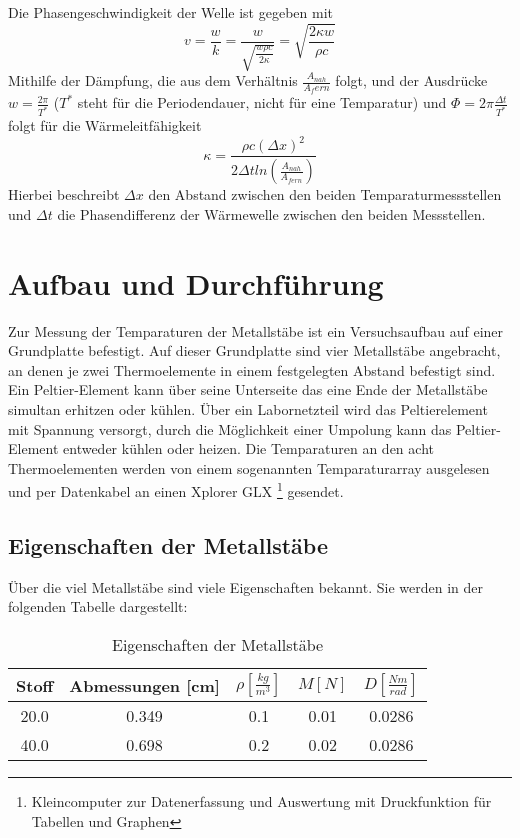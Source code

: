 \documentclass[11pt]{article}
\begin{document}
Die Phasengeschwindigkeit der Welle ist gegeben mit
\begin{equation}
v = \frac{w}{k} = \frac{w}{\sqrt{\frac{w \rho c}{2 \kappa}}} = \sqrt{\frac{2 \kappa w}{\rho c}}
\end{equation}
Mithilfe der Dämpfung, die aus dem Verhältnis $\frac{A_{nah}}{A_fern}$ folgt, und der Ausdrücke $w = \frac{2 \pi}{T^*}$ ($T^*$ steht für die Periodendauer, nicht für eine Temparatur) und $\Phi = 2 \pi \frac{\Delta t}{T^*}$ folgt für die Wärmeleitfähigkeit
\begin{equation}
\kappa = \frac{\rho c (\Delta x)^2}{2 \Delta t ln(\frac{A_{nah}}{A_{fern}})}
\end{equation}
Hierbei beschreibt $\Delta x$ den Abstand zwischen den beiden Temparaturmessstellen und $\Delta t$ die Phasendifferenz der Wärmewelle zwischen den beiden Messstellen.
\section{Aufbau und Durchf\"{u}hrung}
Zur Messung der Temparaturen der Metallstäbe ist ein Versuchsaufbau auf einer Grundplatte befestigt. Auf dieser Grundplatte sind vier Metallstäbe angebracht, an denen je zwei Thermoelemente in einem festgelegten Abstand befestigt sind. Ein Peltier-Element kann über seine Unterseite das eine Ende der Metallstäbe simultan erhitzen oder kühlen. Über ein Labornetzteil wird das Peltierelement mit Spannung versorgt, durch die Möglichkeit einer Umpolung kann das Peltier-Element entweder kühlen oder heizen. Die Temparaturen an den acht Thermoelementen werden von einem sogenannten Temparaturarray ausgelesen und per Datenkabel an einen Xplorer GLX \footnote{Kleincomputer zur Datenerfassung und Auswertung mit Druckfunktion für Tabellen und Graphen} gesendet.
\subsection{Eigenschaften der Metallstäbe}
Über die viel Metallstäbe sind viele Eigenschaften bekannt. Sie werden in der folgenden Tabelle dargestellt:
\begin{table}[h]
\centering
\begin{tabular}{|c|c|c|c|c|}
\hline
Stoff & Abmessungen [cm] & $\rho [\frac{kg}{m^3}]$ & $M [N]$ & $ D [\frac{Nm}{rad}]$ \\
\hline
20.0 & 0.349 & 0.1 & 0.01 & 0.0286\\
40.0 & 0.698 & 0.2 & 0.02 & 0.0286\\
\hline
\end{tabular}
\caption{Eigenschaften der Metallstäbe}
\end{table}
\end{document}
